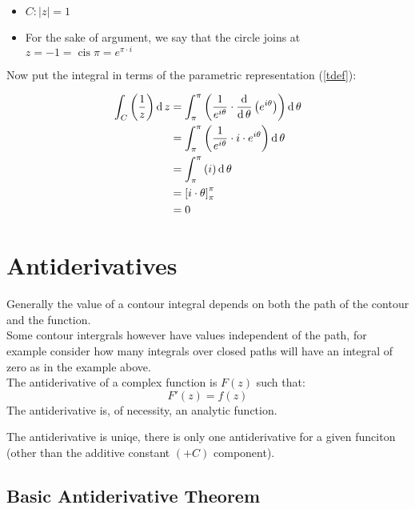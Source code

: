 \documentclass[class=article, crop=false]{standalone}
\begin{document}
\begin{itemize}
\item
  \(C: \left| z \right| = 1\)
\item
  For the sake of argument, we say that the circle joins at
  \(z = -1 = \operatorname{cis} {\pi} = e^{\pi \cdot i}\)
\end{itemize}

Now put the integral in terms of the parametric representation
(\protect\hyperlink{tdef}{{[}tdef{]}}):

\[\begin{aligned}
       \int^{}_{C}\left( \frac{1}{z} \right) \operatorname{d}z &=  \int^{\pi}_{\pi}\left( \frac{1}{e^{i\theta}} \cdot \frac{\operatorname{d} }{\operatorname{d} \theta}\left( e^{i\theta} \right)  \right) \operatorname{d}\theta \notag \\
       &= \int^{\pi}_{\pi}\left( \frac{1}{e^{i\theta}} \cdot i\cdot e^{i\theta} \right) \operatorname{d}\theta \notag \\
       &= \int^{\pi}_{\pi}\left( i \right) \operatorname{d}\theta \notag \\  
       &= \left[ i \cdot \theta \right]^{\pi}_{\pi} \notag \\
       &= 0
     \label{excontint1}
   \end{aligned}\]

\hypertarget{antiderivatives}{%
\section{Antiderivatives}\label{antiderivatives}}

Generally the value of a contour integral depends on both the path of
the contour and the function.\\
Some contour intergrals however have values independent of the path, for
example consider how many integrals over closed paths will have an
integral of zero as in the example above.\\
The antiderivative of a complex function is \(F\left( z \right)\) such
that: \[F'\left( z \right) = f\left( z \right)\] The antiderivative is,
of necessity, an analytic function.

The antiderivative is uniqe, there is only one antiderivative for a
given funciton (other than the additive constant \(\left( + C \right)\)
component).

\hypertarget{basic-antiderivative-theorem}{%
\subsection{Basic Antiderivative
Theorem}\label{basic-antiderivative-theorem}}
\end{document}
